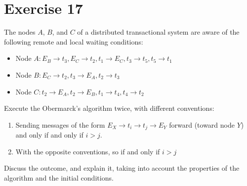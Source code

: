 \section{Exercise 17}

The nodes $A$, $B$, and $C$ of a distributed transactional system are aware of the following remote and local waiting conditions:
\begin{itemize}
    \item Node $A: E_B \rightarrow t_3, E_C \rightarrow t_2, t_1 \rightarrow E_C, t_3 \rightarrow t_5, t_5 \rightarrow t_1$
    \item Node $B: E_C \rightarrow t_2, t_3 \rightarrow E_A, t_2 \rightarrow t_3$
    \item Node $C: t_2 \rightarrow E_A, t_2 \rightarrow E_B, t_1 \rightarrow t_4, t_4 \rightarrow t_2$
\end{itemize}
Execute the Obermarck's algorithm twice, with different conventions:
\begin{enumerate}
    \item Sending messages of the form $E_X \rightarrow t_i \rightarrow t_j \rightarrow E_Y$ forward (toward node $Y$) and only if and only if $i > j$. 
    \item With the opposite conventions, so if and only if $i > j$
\end{enumerate}
Discuss the outcome, and explain it, taking into account the properties of the algorithm and the initial conditions.

